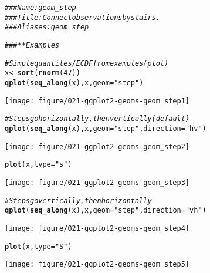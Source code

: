 \documentclass[a4paper,titlepage]{tufte-handout}\usepackage[]{graphicx}\usepackage[]{color}
\makeatletter
\def\maxwidth{ %
  \ifdim\Gin@nat@width>\linewidth
    \linewidth
  \else
    \Gin@nat@width
  \fi
}
\newcommand{\hlnum}[1]{\textcolor[rgb]{0.686,0.059,0.569}{#1}}%
\newcommand{\hlstr}[1]{\textcolor[rgb]{0.192,0.494,0.8}{#1}}%
\newcommand{\hlcom}[1]{\textcolor[rgb]{0.678,0.584,0.686}{\textit{#1}}}%
\newcommand{\hlstd}[1]{\textcolor[rgb]{0.345,0.345,0.345}{#1}}%
\newcommand{\hlkwb}[1]{\textcolor[rgb]{0.69,0.353,0.396}{#1}}%
\newcommand{\hlkwc}[1]{\textcolor[rgb]{0.333,0.667,0.333}{#1}}%
\newcommand{\hlkwd}[1]{\textcolor[rgb]{0.737,0.353,0.396}{\textbf{#1}}}%
\newenvironment{kframe}{%
 \def\at@end@of@kframe{}%
 \ifinner\ifhmode%
  \def\at@end@of@kframe{\end{minipage}}%
  \begin{minipage}{\columnwidth}%
 \fi\fi%
 \def\FrameCommand##1{\hskip\@totalleftmargin \hskip-\fboxsep
 \colorbox{shadecolor}{##1}\hskip-\fboxsep
     \hskip-\linewidth \hskip-\@totalleftmargin \hskip\columnwidth}%
 \MakeFramed {\advance\hsize-\width
   \@totalleftmargin\z@ \linewidth\hsize
   \@setminipage}}%
 {\par\unskip\endMakeFramed%
 \at@end@of@kframe}
\newenvironment{knitrout}{}{} %
\makeatother
\begin{document}
\begin{knitrout}
\color{fgcolor}\begin{kframe}
\begin{alltt}
\hlcom{### Name: geom_step}
\hlcom{### Title: Connect observations by stairs.}
\hlcom{### Aliases: geom_step}

\hlcom{### ** Examples}

\hlcom{# Simple quantiles/ECDF from examples(plot)}
\hlstd{x} \hlkwb{<-} \hlkwd{sort}\hlstd{(}\hlkwd{rnorm}\hlstd{(}\hlnum{47}\hlstd{))}
\hlkwd{qplot}\hlstd{(}\hlkwd{seq_along}\hlstd{(x), x,} \hlkwc{geom}\hlstd{=}\hlstr{"step"}\hlstd{)}
\end{alltt}
\end{kframe}
\texttt{[image: figure/021-ggplot2-geoms-geom\_step1]} 
\begin{kframe}\begin{alltt}
\hlcom{# Steps go horizontally, then vertically (default)}
\hlkwd{qplot}\hlstd{(}\hlkwd{seq_along}\hlstd{(x), x,} \hlkwc{geom}\hlstd{=}\hlstr{"step"}\hlstd{,} \hlkwc{direction} \hlstd{=} \hlstr{"hv"}\hlstd{)}
\end{alltt}
\end{kframe}
\texttt{[image: figure/021-ggplot2-geoms-geom\_step2]} 
\begin{kframe}\begin{alltt}
\hlkwd{plot}\hlstd{(x,} \hlkwc{type} \hlstd{=} \hlstr{"s"}\hlstd{)}
\end{alltt}
\end{kframe}
\texttt{[image: figure/021-ggplot2-geoms-geom\_step3]} 
\begin{kframe}\begin{alltt}
\hlcom{# Steps go vertically, then horizontally}
\hlkwd{qplot}\hlstd{(}\hlkwd{seq_along}\hlstd{(x), x,} \hlkwc{geom}\hlstd{=}\hlstr{"step"}\hlstd{,} \hlkwc{direction} \hlstd{=} \hlstr{"vh"}\hlstd{)}
\end{alltt}
\end{kframe}
\texttt{[image: figure/021-ggplot2-geoms-geom\_step4]} 
\begin{kframe}\begin{alltt}
\hlkwd{plot}\hlstd{(x,} \hlkwc{type} \hlstd{=} \hlstr{"S"}\hlstd{)}
\end{alltt}
\end{kframe}
\texttt{[image: figure/021-ggplot2-geoms-geom\_step5]} 
\begin{kframe}\begin{alltt}

\end{alltt}
\end{kframe}
\end{knitrout}
\end{document}
